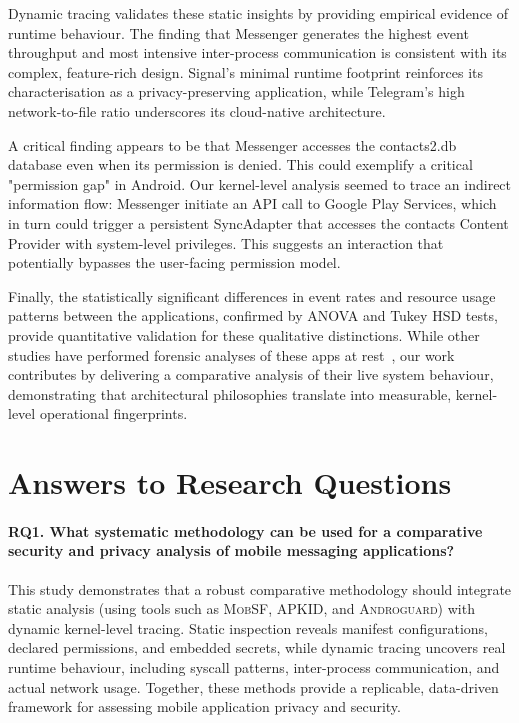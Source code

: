\documentclass[a4paper,12pt]{report}
\begin{document}
Dynamic tracing validates these static insights by providing empirical evidence of runtime behaviour. The finding that Messenger generates the highest event throughput and most intensive inter-process communication is consistent with its complex, feature-rich design. Signal's minimal runtime footprint reinforces its characterisation as a privacy-preserving application, while Telegram's high network-to-file ratio underscores its cloud-native architecture.

A critical finding appears to be that Messenger accesses the contacts2.db database even when its permission is denied. This could exemplify a critical "permission gap" in Android. Our kernel-level analysis seemed to trace an indirect information flow: Messenger initiate an API call to Google Play Services, which in turn could trigger a persistent SyncAdapter that accesses the contacts Content Provider with system-level privileges. This suggests an interaction that potentially bypasses the user-facing permission model.

Finally, the statistically significant differences in event rates and resource usage patterns between the applications, confirmed by ANOVA and Tukey HSD tests, provide quantitative validation for these qualitative distinctions. While other studies have performed forensic analyses of these apps at rest~\cite{anglano2015whatsapp, obermeier2018signal}, our work contributes by delivering a comparative analysis of their live system behaviour, demonstrating that architectural philosophies translate into measurable, kernel-level operational fingerprints.

\section{Answers to Research Questions}

\paragraph{\textbf{RQ1.} What systematic methodology can be used for a comparative security and privacy analysis of mobile messaging applications?}

This study demonstrates that a robust comparative methodology should integrate static analysis (using tools such as \textsc{MobSF}, \textsc{APKID}, and \textsc{Androguard}) with dynamic kernel-level tracing. Static inspection reveals manifest configurations, declared permissions, and embedded secrets, while dynamic tracing uncovers real runtime behaviour, including syscall patterns, inter-process communication, and actual network usage. Together, these methods provide a replicable, data-driven framework for assessing mobile application privacy and security.
\end{document}
